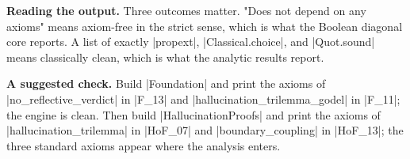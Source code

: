 \documentclass{memoir}
\begin{document}
\textbf{Reading the output.} Three outcomes matter. "Does not depend on any axioms" means
axiom-free in the strict sense, which is what the Boolean diagonal core reports. A
list of exactly \LeanVerb|propext|, \LeanVerb|Classical.choice|, and \LeanVerb|Quot.sound| means classically
clean, which is what the analytic results report.

\textbf{A suggested check.} Build \LeanVerb|Foundation| and print the axioms of \LeanVerb|no_reflective_verdict|
in \LeanVerb|F_13| and \LeanVerb|hallucination_trilemma_godel| in \LeanVerb|F_11|; the engine is clean. Then
build \LeanVerb|HallucinationProofs| and print the axioms of \LeanVerb|hallucination_trilemma| in
\LeanVerb|HoF_07| and \LeanVerb|boundary_coupling| in \LeanVerb|HoF_13|; the three standard axioms appear where
the analysis enters.
\end{document}
